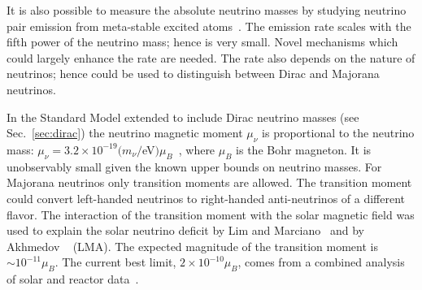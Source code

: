 It is also possible to measure the absolute neutrino masses by studying neutrino pair emission from meta-stable excited atoms~\cite{Yos07}. The emission rate scales with the fifth power of  the neutrino mass; hence is very small. Novel mechanisms which could largely enhance the rate are needed. The rate also depends on the nature of neutrinos; hence could be used to distinguish between Dirac and Majorana neutrinos.

In the Standard Model extended to include Dirac neutrino masses (see Sec.~\ref{sec:dirac}) the neutrino magnetic moment $\mu_{\nu}$ is proportional to the neutrino mass: $\mu_{\nu} = 3.2 \times 10^{-19}(m_{\nu}/$eV$)\mu_{B}$~\cite{Fuj80}, where $\mu_{B}$ is the Bohr magneton. It is unobservably small given the known upper bounds on neutrino masses. For Majorana neutrinos only transition moments are allowed. The transition moment could convert left-handed neutrinos to right-handed anti-neutrinos of a different flavor. The interaction of the transition moment with the solar magnetic field was used to explain the solar neutrino deficit by Lim and Marciano~\cite{Lim88} and by Akhmedov ~\cite{Akh88} (LMA). The expected magnitude of the transition moment is $\sim 10^{-11}\mu_{B}$. The current best limit, $2 \times 10^{-10}\mu_{B}$, comes from a combined analysis of solar and reactor data~\cite{Gri02}.

